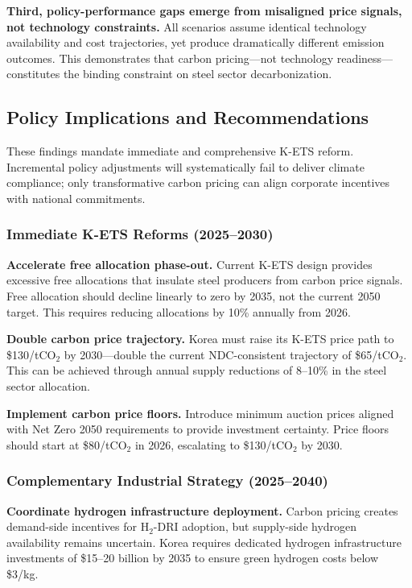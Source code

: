\documentclass[preprint,5p,authoryear]{elsarticle}
\begin{document}
\textbf{Third, policy-performance gaps emerge from misaligned price signals, not technology constraints.} All scenarios assume identical technology availability and cost trajectories, yet produce dramatically different emission outcomes. This demonstrates that carbon pricing—not technology readiness—constitutes the binding constraint on steel sector decarbonization.

\subsection{Policy Implications and Recommendations}

These findings mandate immediate and comprehensive K-ETS reform. Incremental policy adjustments will systematically fail to deliver climate compliance; only transformative carbon pricing can align corporate incentives with national commitments.

\subsubsection{Immediate K-ETS Reforms (2025--2030)}

\textbf{Accelerate free allocation phase-out.} Current K-ETS design provides excessive free allocations that insulate steel producers from carbon price signals. Free allocation should decline linearly to zero by 2035, not the current 2050 target. This requires reducing allocations by 10\% annually from 2026.

\textbf{Double carbon price trajectory.} Korea must raise its K-ETS price path to \$130/tCO$_2$ by 2030—double the current NDC-consistent trajectory of \$65/tCO$_2$. This can be achieved through annual supply reductions of 8--10\% in the steel sector allocation.

\textbf{Implement carbon price floors.} Introduce minimum auction prices aligned with Net Zero 2050 requirements to provide investment certainty. Price floors should start at \$80/tCO$_2$ in 2026, escalating to \$130/tCO$_2$ by 2030.

\subsubsection{Complementary Industrial Strategy (2025--2040)}

\textbf{Coordinate hydrogen infrastructure deployment.} Carbon pricing creates demand-side incentives for H$_2$-DRI adoption, but supply-side hydrogen availability remains uncertain. Korea requires dedicated hydrogen infrastructure investments of \$15--20 billion by 2035 to ensure green hydrogen costs below \$3/kg.
\end{document}
